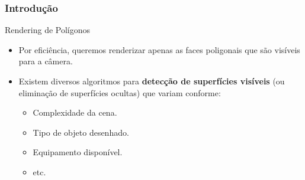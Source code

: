 \documentclass{beamer}
\begin{document}
\begin{frame}
\frametitle{Introdução}

		\begin{block}{Rendering de Polígonos}
			\begin{itemize}
				\item Por eficiência, queremos renderizar apenas as faces poligonais que são visíveis para a câmera.
			\end{itemize} 
		\end{block}
		\begin{block}{}
			\begin{itemize}
				\item Existem diversos algoritmos para \textbf{detecção de superfícies visíveis} (ou eliminação de superfícies ocultas) que variam conforme:
				\begin{itemize}
					\item Complexidade da cena.
					\item Tipo de objeto desenhado.
					\item Equipamento disponível.
					\item etc. 
				\end{itemize}
			\end{itemize} 
		\end{block}
	
\end{frame}
\end{document}

